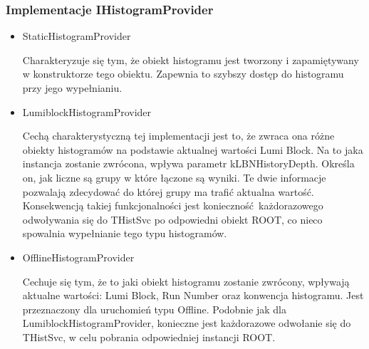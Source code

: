 \subsubsection{Implementacje IHistogramProvider}
\begin{itemize}
\item StaticHistogramProvider

	Charakteryzuje się tym, że obiekt histogramu jest tworzony i zapamiętywany w konstruktorze tego obiektu. Zapewnia to szybszy dostęp do histogramu przy jego wypełnianiu. 
\item LumiblockHistogramProvider

	Cechą charakterystyczną tej implementacji jest to, że zwraca ona różne obiekty histogramów na podstawie aktualnej wartości Lumi Block. 
	Na to jaka instancja zostanie zwrócona, wpływa parametr kLBNHistoryDepth.
	Określa on, jak liczne są grupy w które łączone są wyniki.
	Te dwie informacje pozwalają zdecydować do której grupy ma trafić aktualna wartość.
	Konsekwencją takiej funkcjonalności jest konieczność każdorazowego odwoływania się do THistSvc po odpowiedni obiekt ROOT, co nieco spowalnia wypełnianie tego typu histogramów.
\item OfflineHistogramProvider

	Cechuje się tym, że to jaki obiekt histogramu zostanie zwrócony, wpływają aktualne wartości: Lumi Block, Run Number oraz konwencja histogramu.
	Jest przeznaczony dla uruchomień typu Offline.
	Podobnie jak dla LumiblockHistogramProvider, konieczne jest każdorazowe odwołanie się do THistSvc, w celu pobrania odpowiedniej instancji ROOT.
\end{itemize}

